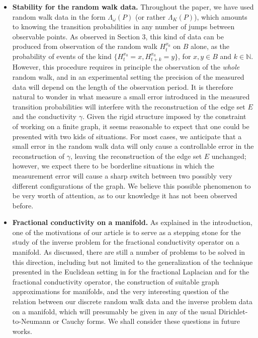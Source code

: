 \documentclass[a4paper,11pt,oneside]{amsart}
\newcommand{\N}{{\mathbb N}}
\begin{document}
\begin{itemize}
    \item \textbf{Stability for the random walk data.} Throughout the paper, we have used random walk data in the form $\Lambda_\omega(P)$ (or rather $\Lambda_K(P)$), which amounts to knowing the transition probabilities in any number of jumps between observable points. As observed in Section 3, this kind of data can be produced from observation of the random walk $H^{x_0}_t$ on $B$ alone, as the probability of events of the kind $\{H^{x_0}_t=x, H^{x_0}_{t+k}=y\}$, for $x,y\in B$ and $k\in\N$. However, this procedure requires in principle the observation of the \emph{whole} random walk, and in an experimental setting the precision of the measured data will depend on the length of the observation period. It is therefore natural to wonder in what measure a small error introduced in the measured transition probabilities will interfere with the reconstruction of the edge set $E$ and the conductivity $\gamma$. Given the rigid structure imposed by the constraint of working on a finite graph, it seems reasonable to expect that one could be presented with two kids of situations. For most cases, we anticipate that a small error in the random walk data will only cause a controllable error in the reconstruction of $\gamma$, leaving the reconstruction of the edge set $E$ unchanged; however, we expect there to be borderline situations in which the measurement error will cause a sharp switch between two possibly very different configurations of the graph. We believe this possible phenomenon to be very worth of attention, as to our knowledge it has not been observed before.\\
    \item \textbf{Fractional conductivity on a manifold.} As explained in the introduction, one of the motivations of our article is to serve as a stepping stone for the study of the inverse problem for the fractional conductivity operator on a manifold. As discussed, there are still a number of problems to be solved in this direction, including but not limited to the generalization of the technique presented in the Euclidean setting in \cite{Val09} for the fractional Laplacian and \cite{C20} for the fractional conductivity operator, the construction of suitable graph approximations for manifolds, and the very interesting question of the relation between our discrete random walk data and the inverse problem data on a manifold, which will presumably be given in any of the usual Dirichlet-to-Neumann or Cauchy forms. We shall consider these questions in future works. \\ 

\end{itemize}
\end{document}
